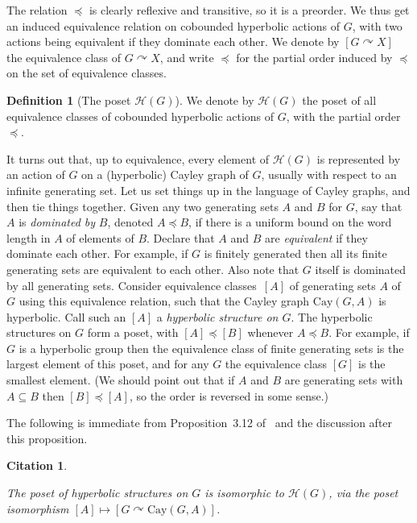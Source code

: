 \documentclass[10pt,a4paper]{article}
\theoremstyle{definition}
\newtheorem{defi}[cdrthm]{Definition}
\theoremstyle{remark}
\newcommand{\Hyp}{\mathcal{H}}
\newcommand{\Cay}{\mathrm{Cay}}
\theoremstyle{plain}
\newtheorem{cit}[cdrthm]{Citation}
\begin{document}
The relation $\preceq$ is clearly reflexive and transitive, so it is a preorder. We thus get an induced equivalence relation on cobounded hyperbolic actions of $G$, with two actions being equivalent if they dominate each other. We denote by $[G\curvearrowright X]$ the equivalence class of $G\curvearrowright X$, and write $\preccurlyeq$ for the partial order induced by $\preceq$ on the set of equivalence classes.

\begin{defi}[The poset $\Hyp(G)$]
We denote by $\Hyp(G)$ the poset of all equivalence classes of cobounded hyperbolic actions of $G$, with the partial order $\preccurlyeq$.
\end{defi}

It turns out that, up to equivalence, every element of $\Hyp(G)$ is represented by an action of $G$ on a (hyperbolic) Cayley graph of $G$, usually with respect to an infinite generating set. Let us set things up in the language of Cayley graphs, and then tie things together. Given any two generating sets $A$ and $B$ for $G$, say that $A$ is \emph{dominated by} $B$, denoted $A\preceq B$, if there is a uniform bound on the word length in $A$ of elements of $B$. Declare that $A$ and $B$ are \emph{equivalent} if they dominate each other. For example, if $G$ is finitely generated then all its finite generating sets are equivalent to each other. Also note that $G$ itself is dominated by all generating sets. Consider equivalence classes~$[A]$ of generating sets $A$ of $G$ using this equivalence relation, such that the Cayley graph $\Cay(G,A)$ is hyperbolic. Call such an $[A]$ a \emph{hyperbolic structure on $G$}. The hyperbolic structures on $G$ form a poset, with $[A]\preccurlyeq [B]$ whenever $A\preceq B$. For example, if $G$ is a hyperbolic group then the equivalence class of finite generating sets is the largest element of this poset, and for any $G$ the equivalence class $[G]$ is the smallest element. (We should point out that if $A$ and $B$ are generating sets with $A\subseteq B$ then $[B]\preccurlyeq [A]$, so the order is reversed in some sense.)

The following is immediate from Proposition~3.12 of~\cite{ABO} and the discussion after this proposition.

\begin{cit}
\label{cit:cayley:representative}

The poset of hyperbolic structures on $G$ is isomorphic to $\Hyp(G)$, via the poset isomorphism $[A]\mapsto [G\curvearrowright \Cay(G,A)]$.
\end{cit}
\end{document}
